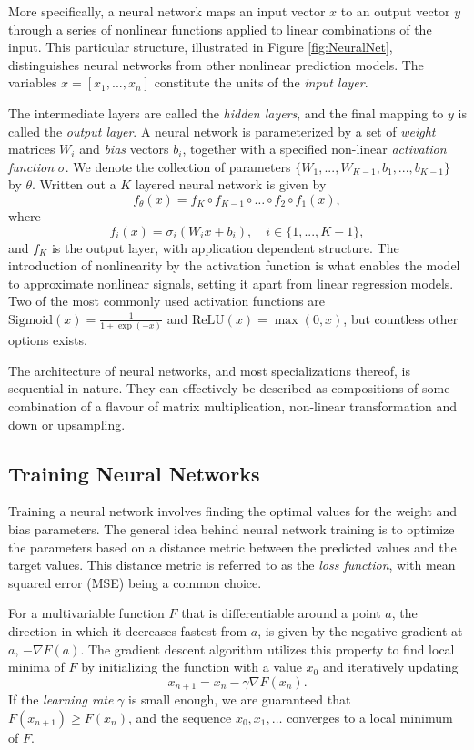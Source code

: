 \documentclass[../../thesis.tex]{subfiles}
\begin{document}
More specifically, a neural network maps an input vector $x$ to an output vector $y$ through a series of nonlinear functions applied to linear combinations of the input. This particular structure, illustrated in Figure \ref{fig:NeuralNet}, distinguishes neural networks from other nonlinear prediction models. The variables $x = [x_1,...,x_n]$ constitute the units of the \textit{input layer}. 

The intermediate layers are called the \textit{hidden layers}, and the final mapping to $y$ is called the \textit{output layer}. A neural network is parameterized by a set of \textit{weight} matrices $W_i$ and \textit{bias} vectors $b_i$, together with a specified non-linear \textit{activation function} $\sigma$. We denote the collection of parameters $\{W_1,...,W_{K-1}, b_1,...,b_{K-1}\}$ by $\theta$. Written out a $K$ layered neural network is given by 
\[ 
f_\theta(x) = f_K \circ f_{K-1} \circ \ldots \circ f_2 \circ f_1(x),
\]
where 
$$f_i(x) = \sigma_i(W_ix+b_i), \quad i \in \{1,...,K-1\},$$ 
and $f_K$ is the output layer, with application dependent structure.\newline
The introduction of nonlinearity by the activation function is what enables the model to approximate nonlinear signals, setting it apart from linear regression models. Two of the most commonly used activation functions are $\text{Sigmoid}(x) = \tfrac{1}{1+\exp(-x)}$ and $\text{ReLU}(x) = \max(0,x)$, but countless other options exists.\newline

The architecture of neural networks, and most specializations thereof, is sequential in nature. They can effectively be described as compositions of some combination of a flavour of matrix multiplication, non-linear transformation and down or upsampling. 

\subsection{Training Neural Networks}

Training a neural network involves finding the optimal values for the weight and bias parameters. The general idea behind neural network training is to optimize the parameters based on a distance metric between the predicted values and the target values. This distance metric is referred to as the \textit{loss function}, with mean squared error (MSE) being a common choice.

For a multivariable function $F$ that is differentiable around a point $a$, the direction in which it decreases fastest from $a$, is given by the negative gradient at $a$, $-\nabla F(a)$. The gradient descent algorithm utilizes this property to find local minima of $F$ by initializing the function with a value $x_0$ and iteratively updating 
\[
    x_{n+1} = x_{n} -\gamma \nabla F(x_{n}).
\] 
If the \textit{learning rate} $\gamma$ is small enough, we are guaranteed that $F(x_{n+1})\geq F(x_{n})$, and the sequence $x_0,x_1,\dots$ converges to a local minimum of $F$.\newline
\end{document}
